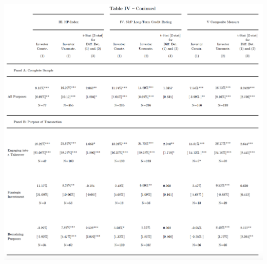 \documentclass[12pt]{article}
\begin{document}
\pagebreak

\begin{table}[!htb]
	\centering
	\begin{adjustbox}{width=\textwidth}
		\includegraphics{ar_measure2_final}
	\end{adjustbox}
\end{table}
\end{document}
